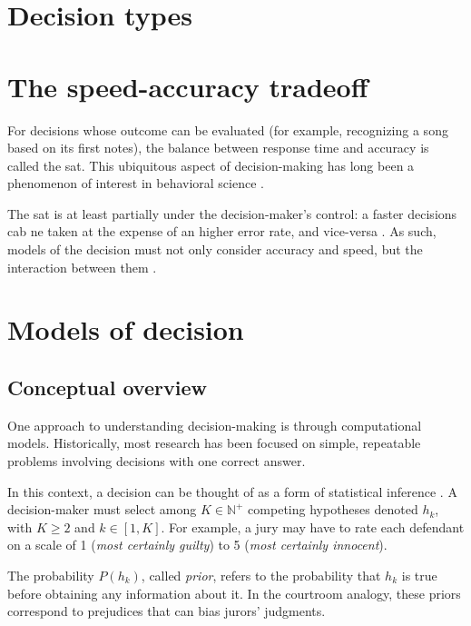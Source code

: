 \section{Decision types}


\section{The speed-accuracy tradeoff}

For decisions whose outcome can be evaluated (for example, recognizing a song based on its first notes), the balance between response time and accuracy is called the \acrfull{sat}. This ubiquitous aspect of decision-making has long been a phenomenon of interest in behavioral science \cite{heitzSpeedaccuracyTradeoffHistory2014}.

The \acrshort{sat} is at least partially under the decision-maker's control: a faster decisions cab ne taken at the expense of an higher error rate, and vice-versa \cite{ratcliffDiffusionDecisionModel2016}. As such, models of the decision must not only consider accuracy and speed, but the interaction between them \cite{myersPracticalIntroductionUsing2022}.

\section{Models of decision}

\subsection{Conceptual overview}

One approach to understanding decision-making is through computational models. Historically, most research has been focused on simple, repeatable problems involving decisions with one correct answer.

In this context, a decision can be thought of as a form of statistical inference \cite{goldNeuralBasisDecision2007}. A decision-maker must select among $K \in \mathbb{N^{+}}$ competing hypotheses denoted $h_k$, with $K \ge 2$ and $k \in [1,K]$. For example, a jury may have to rate each defendant on a scale of 1 (\textit{most certainly guilty}) to 5 (\textit{most certainly innocent}).

The probability $P(h_k)$, called \textit{prior}, refers to the probability that $h_k$ is true before obtaining any information about it. In the courtroom analogy, these priors correspond to prejudices that can bias jurors’ judgments.

